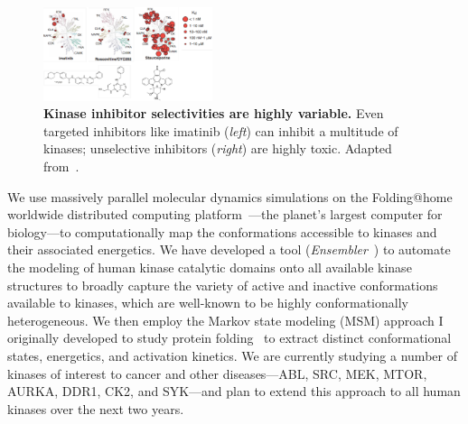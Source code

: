 \documentclass[10pt]{article}
\begin{document}
\begin{figure}
\vspace{-0.3cm}
\includegraphics[width=0.44\textwidth]{figures/kinase-inhibitor-selectivity.pdf}
\vspace{-0.3cm}
\caption{\footnotesize \label{figure:kinase-inhibitor-selectivity} {\bf Kinase inhibitor selectivities are highly variable.}
Even targeted inhibitors like imatinib (\emph{left}) can inhibit a multitude of kinases; unselective inhibitors (\emph{right}) are highly toxic.
Adapted from~\cite{fabian:nature-biotech:2005:kinase-selectivity-map}.}
\end{figure}

We use massively parallel molecular dynamics simulations on the Folding@home worldwide distributed computing platform~\cite{shirts-pande:science:2000:folding-at-home}---the planet's largest computer for biology---to computationally map the conformations accessible to kinases and their associated energetics.
We have developed a tool (\emph{Ensembler}~\cite{ensembler}) to automate the modeling of human kinase catalytic domains onto all available kinase structures to broadly capture the variety of active and inactive conformations available to kinases, which are well-known to be highly conformationally heterogeneous. 
We then employ the Markov state modeling (MSM) approach I originally developed to study protein folding~\cite{chodera:2006:mms:long-time-dynamics,chodera:jcp:2007,noe:jcp:2011:msm-review} to extract distinct conformational states, energetics, and activation kinetics.
We are currently studying a number of kinases of interest to cancer and other diseases---ABL, SRC, MEK, MTOR, AURKA, DDR1, CK2, and SYK---and plan to extend this approach to all human kinases over the next two years.
\end{document}

